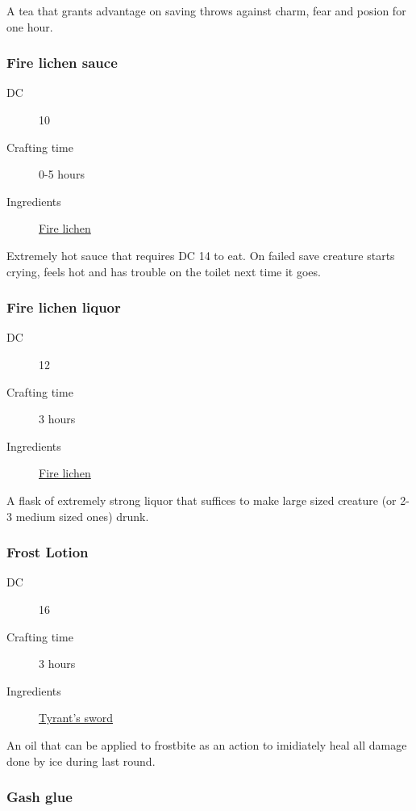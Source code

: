 A tea that grants advantage on saving throws against charm, fear and posion for one hour. 

\subsubsection{Fire lichen sauce}
\label{Fire lichen sauce}

\begin{description}
\item [DC] 10 \survival
\item [Crafting time] 0-5 hours
\item [Ingredients] \hyperref[Fire lichen]{Fire lichen}
\end{description}

Extremely hot sauce that requires DC 14 \constitutionsave to eat. On failed save creature starts crying, feels hot
and has trouble on the toilet next time it goes.

\subsubsection{Fire lichen liquor}
\label{Fire lichen liquor}

\begin{description}
\item [DC] 12 \nature
\item [Crafting time] 3 hours
\item [Ingredients] \hyperref[Fire lichen]{Fire lichen}
\end{description}

A flask of extremely strong liquor that suffices to make large sized creature (or 2-3 medium sized ones) drunk.

\subsubsection{Frost Lotion}
\label{Frost Lotion}

\begin{description}
\item [DC] 16 \medicine
\item [Crafting time] 3 hours
\item [Ingredients] \hyperref[Tyrant's Sword]{Tyrant's sword}
\end{description}

An oil that can be applied to frostbite as an action to imidiately heal all damage done by ice 
during last round.

\subsubsection{Gash glue}
\label{Gash glue}

